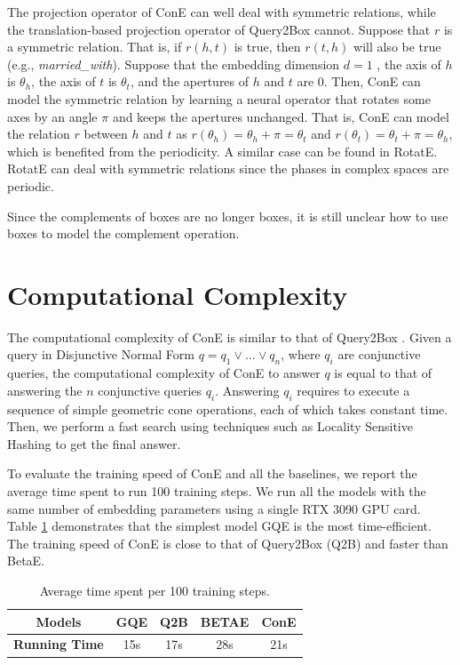 \documentclass{article}
\newcommand{\betae}{{\normalsize{B}\footnotesize{ETA}\normalsize{E}}}
\begin{document}
The projection operator of ConE can well deal with symmetric relations, while the translation-based projection operator of Query2Box cannot.  Suppose that $r$ is a symmetric relation. That is, if $r(h,t)$  is true, then $r(t,h)$    will also be true (e.g., \textit{married\_with}).  Suppose that the embedding dimension $d=1$   , the axis of $h$ is $\theta_h$, the axis of $t$ is $\theta_t$, and the apertures of $h$ and $t$ are $0$. Then, ConE can model the symmetric relation by learning a neural operator that rotates some axes by an angle $\pi$ and keeps the apertures unchanged. That is, ConE can model the relation $r$ between $h$ and $t$ as $r(\theta_h)=\theta_h+\pi=\theta_t$ and $r(\theta_t)=\theta_t+\pi=\theta_h$, which is benefited from the periodicity. A similar case can be found in RotatE. RotatE can deal with symmetric relations since the phases in complex spaces are periodic.

Since the complements of boxes are no longer boxes, it is still unclear how to use boxes to model the complement operation. 

\section{Computational Complexity}
The computational complexity of ConE is similar to that of Query2Box \cite{q2b}. Given a query in Disjunctive Normal Form $q=q_1\lor \dots\lor q_n$, where $q_i$ are conjunctive queries, the computational complexity of ConE to answer $q$ is equal to that of answering the $n$ conjunctive queries $q_i$. Answering $q_i$ requires to execute a sequence of simple geometric cone operations, each of which takes constant time. Then, we perform a fast search using techniques such as Locality Sensitive Hashing \cite{lsh} to get the final answer.

To evaluate the training speed of ConE and all the baselines, we report the average time spent to run 100 training steps. We run all the models with the same number of embedding parameters using a single RTX 3090 GPU card. Table \ref{tab:running_time} demonstrates that the simplest model GQE is the most time-efficient. The training speed of ConE is close to that of Query2Box (Q2B) and faster than BetaE. 

\begin{table}[ht]
    \centering
    \caption{Average time spent per 100 training steps.}
    \label{tab:running_time}
    \vspace{1mm}
    \begin{tabular}{ccccc}
    \toprule
    \textbf{Models} & \textbf{GQE} & \textbf{Q2B} & \textbf{\betae} & \textbf{ConE}\\
    \midrule
     \textbf{Running Time} & 15s  & 17s  & 28s & 21s\\
     \bottomrule
    \end{tabular}
\end{table}
\end{document}
